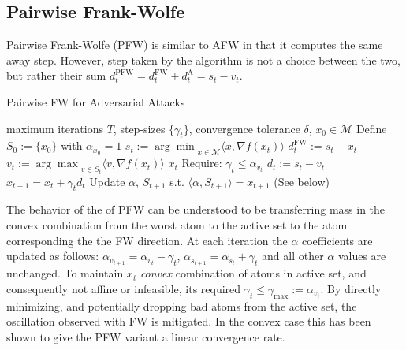 \documentclass{article}
\begin{document}
\subsection{Pairwise Frank-Wolfe}
Pairwise Frank-Wolfe (PFW) is similar to AFW in that it computes the same away step. However, step taken by the algorithm is not a choice between the two, but rather their sum $d_t^\text{PFW} = d_t^\text{FW} + d_t^\text{A} = s_t - v_t$. 

\begin{algorithm}[H]
\caption{Pairwise FW for Adversarial Attacks}\label{alg:cap}
\begin{algorithmic}[1]
\Require maximum iterations $T$, step-sizes $\{\gamma_t\}$, convergence tolerance $\delta$, $x_0 \in \mathcal{M}$
\State Define $S_0 := \{x_0\}$ with $\alpha_{x_0} = 1$
	\State $s_t  := {\arg \min}_{x\in\mathcal{M}} \langle x, \nabla f(x_t)\rangle$ 
	\State $d_t^{\text{FW}} := s_t - x_t$
	\State $v_t  := {\arg \max}_{v\in S_t} \langle v, \nabla f(x_t)\rangle$
	  $x_t$ \hfill {}
	\EndIf
	\State Require: $\gamma_t \leq \alpha_{v_t}$
	\State $d_t := s_t - v_t$
	\State $x_{t+1} = x_t + \gamma_t d_t$
	\State Update $\alpha$, $S_{t+1}$ s.t. $\langle \alpha, S_{t+1}\rangle = x_{t+1}$ (See below)
\EndFor
\end{algorithmic}
\end{algorithm}

The behavior of the of PFW can be understood to be transferring mass in the convex combination from the worst atom to the active set to the atom corresponding the the FW direction. At each iteration the $\alpha$ coefficients are updated as follows: $\alpha_{v_{t+1}} = \alpha_{v_t} - \gamma_t$, $\alpha_{s_{t+1}} = \alpha_{s_t} + \gamma_t$ and all other $\alpha$ values are unchanged. To maintain $x_t$ \emph{convex} combination of atoms in active set, and consequently not affine or infeasible, its required $\gamma_t \leq \gamma_\text{max} := \alpha_{v_t}$. By directly minimizing, and potentially dropping bad atoms from the active set, the oscillation observed with FW is mitigated. In the convex case this has been shown to give the PFW variant a linear convergence rate.
\end{document}
